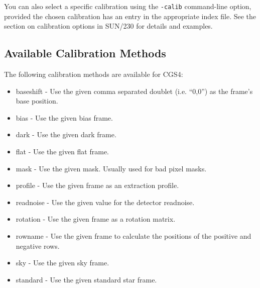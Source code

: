 \documentclass[twoside,11pt]{article}
\newenvironment{latexonly}{}{}
\newcommand{\xref}[3]{#1}
\renewcommand{\_}{\texttt{\symbol{95}}}
\begin{document}
You can also select a specific calibration using the {\tt -calib}
command-line option, provided the chosen calibration has an entry
in the appropriate index file.  See
\begin{latexonly}
the section on
\end{latexonly}
\xref{calibration options}{sun230}{calibration_options}
\begin{latexonly}
in SUN/230
\end{latexonly}
for details and examples.

\subsection{Available Calibration Methods}

The following calibration methods are available for CGS4:

\begin{itemize}

\item baseshift - Use the given comma separated doublet (i.e. ``0,0'') as the
frame's base position.

\item bias - Use the given bias frame.

\item dark - Use the given dark frame.

\item flat - Use the given flat frame.

\item mask - Use the given mask. Usually used for bad pixel masks.

\item profile - Use the given frame as an extraction profile.

\item readnoise - Use the given value for the detector readnoise.

\item rotation - Use the given frame as a rotation matrix.

\item rowname - Use the given frame to calculate the positions of the positive
and negative rows.

\item sky - Use the given sky frame.

\item standard - Use the given standard star frame.

\end{itemize}

\end{document}
